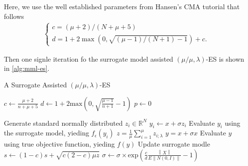Here, we use the well established parameters from Hansen's CMA tutorial \cite{hansen2016cma} that follows 
\begin{align}
\begin{cases}
c = (\mu+2)/(N+\mu+5)\\
d=1+2 \max\left (0, \sqrt{(\mu-1)/(N+1)-1} \right)+c.
\end{cases}
\end{align}

Then one signle iteration fo the surrogate model assisted $(\mu/\mu,\lambda)$-ES is shown in \ref{alg:mml-es}.


\begin{algorithm}
\caption{A Surrogate Assisted $(\mu/\mu,\lambda)$-ES}
\label{alg:mml-es}
\begin{algorithmic}[1]
\STATE $c \leftarrow  \frac{\mu +2}{n+\mu+5}$ 
\STATE $d \leftarrow 1 + 2 \text{max}(0, \sqrt{\frac{\mu - 1}{n+1} } - 1 ) $
\STATE $p \leftarrow 0$

		\STATE Generate standard normally distributed $z_i \in \mathbb{R}^N $
		\STATE $y_i \leftarrow x + \sigma z_i$
		\STATE Evaluate $y_i$ using the surrogate model, yieding $f_{\epsilon}(y_i)$
	\ENDFOR
	\STATE $z = \frac{1}{\mu} \sum_{i=1}^{\mu} z_{i;\lambda}$
	\STATE $y = x + \sigma x$
	\STATE Evaluate $y$ using true objective function, yieding $f(y)$
	\STATE Update surrogate modle 
	\STATE $s \leftarrow (1-c)s + \sqrt{ c(2-c) \mu z}$
	\STATE $\sigma \leftarrow \sigma \times \text{exp} \left(\frac{c}{d} \frac{\left\lVert X \right\rVert} { E \left\lVert N(0,I) \right\rVert} -1 \right )$
		

\ENDWHILE

\end{algorithmic}
\end{algorithm}


